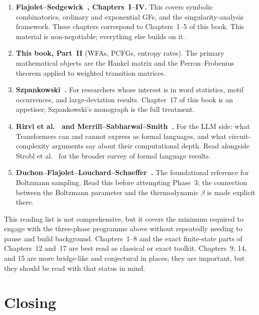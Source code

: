 \begin{enumerate}
  \item \textbf{Flajolet--Sedgewick~\cite{FlajoletSedgewick2009},
  Chapters~I--IV.}  This covers symbolic combinatorics, ordinary and
  exponential GFs, and the singularity-analysis framework.  These
  chapters correspond to Chapters~1--5 of this book.  This material is
  non-negotiable; everything else builds on it.

  \item \textbf{This book, Part~II} (WFAs, PCFGs, entropy rates).
  The primary mathematical objects are the Hankel matrix and the
  Perron--Frobenius theorem applied to weighted transition matrices.

  \item \textbf{Szpankowski~\cite{Szpankowski2001}.}  For researchers
  whose interest is in word statistics, motif occurrences, and
  large-deviation results.  Chapter~17 of this book is an appetiser;
  Szpankowski's monograph is the full treatment.

  \item \textbf{Rizvi et al.~\cite{RizviEtAl2024} and
  Merrill--Sabharwal--Smith~\cite{MerrillSabharwalSmith2022}.}  For the
  LLM side: what Transformers can and cannot express as formal languages,
  and what circuit-complexity arguments say about their computational
  depth.  Read alongside Strobl et al.~\cite{StroblEtAl2024} for the
  broader survey of formal language results.

  \item \textbf{Duchon--Flajolet--Louchard--Schaeffer~\cite{DuchonFlajoletLouchardSchaeffer2004}.}
  The foundational reference for Boltzmann sampling.  Read this before
  attempting Phase~3; the connection between the Boltzmann parameter and
  the thermodynamic $\beta$ is made explicit there.
\end{enumerate}

This reading list is not comprehensive, but it covers the minimum
required to engage with the three-phase programme above without
repeatedly needing to pause and build background.
Chapters~1--8 and the exact finite-state parts of Chapters~12 and~17 are
best read as classical or exact toolkit. Chapters~9, 14, and 15 are more
bridge-like and conjectural in places; they are important, but they
should be read with that status in mind.

\section{Closing}
\label{ch19:closing}

